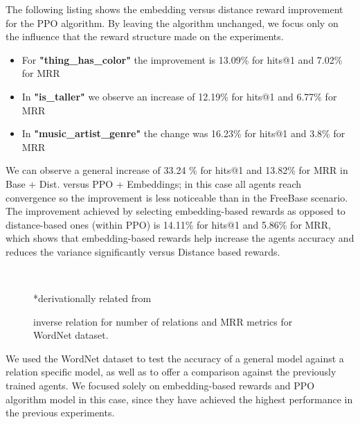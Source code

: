 The following listing shows the embedding versus distance reward improvement for the PPO algorithm. By leaving the algorithm unchanged, we focus only on the influence that the reward structure made on the experiments.

\begin{itemize}
    \item{For \textbf{"thing\_has\_color"} the improvement is 13.09\% for hits@1 and 7.02\% for MRR}
    
    \item{In \textbf{"is\_taller"} we observe an increase of 12.19\% for hits@1 and 6.77\% for MRR}
    
    \item{In \textbf{"music\_artist\_genre"} the change was 16.23\% for hits@1 and 3.8\% for MRR}
\end{itemize}

We can observe a general increase of 33.24 \% for hits@1 and 13.82\% for MRR in Base + Dist. versus PPO + Embeddings; in this case all agents reach convergence so the improvement is less noticeable than in the FreeBase scenario. The improvement achieved by selecting embedding-based rewards as opposed to distance-based ones (within PPO) is 14.11\% for hits@1 and 5.86\% for MRR, which shows that embedding-based rewards help increase the agents accuracy and reduces the variance significantly versus Distance based rewards.



\begin{figure}[!h]
    \centering
    \subfigure[WN18RR - is taller]{
        
        \label{fig:relnum}
    }~
    \subfigure[WN18RR - music]{
        
        \label{fig:relMRR}
    }\\
    
    \caption{inverse relation for number of relations and MRR metrics for WordNet dataset.}
    \label{fig:regrbarchart}
    \footnotesize{*derivationally related from}
\end{figure}

We used the WordNet dataset to test the accuracy of a general model against a relation specific model, as well as to offer a comparison against the previously trained agents. We focused solely on embedding-based rewards and PPO algorithm model in this case, since they have achieved the highest performance in the previous experiments.

